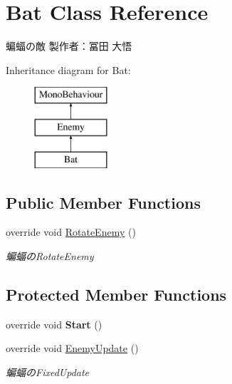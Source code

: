 \hypertarget{class_bat}{}\section{Bat Class Reference}
\label{class_bat}


蝙蝠の敵 製作者：冨田 大悟  


Inheritance diagram for Bat\+:\begin{figure}[H]
\begin{center}
\leavevmode
\includegraphics[height=3.000000cm]{class_bat}
\end{center}
\end{figure}
\subsection*{Public Member Functions}
\begin{DoxyCompactItemize}
\item 
override void \hyperlink{class_bat_a94ef7dfdaf7801f5fa36af5ece127fe1}{Rotate\+Enemy} ()
\begin{DoxyCompactList}\small\item\em 蝙蝠の\+Rotate\+Enemy \end{DoxyCompactList}\end{DoxyCompactItemize}
\subsection*{Protected Member Functions}
\begin{DoxyCompactItemize}
\item 
\mbox{\label{class_bat_a40c63f070f1cd3672b4cb78449ac789d}} 
override void {\bfseries Start} ()
\item 
override void \hyperlink{class_bat_af1e6e4432c5f803973be596a31cbb650}{Enemy\+Update} ()
\begin{DoxyCompactList}\small\item\em 蝙蝠の\+Fixed\+Update \end{DoxyCompactList}\end{DoxyCompactItemize}

